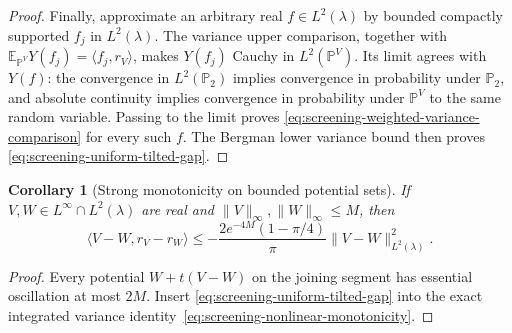 \documentclass[11pt,a4paper]{article}
\numberwithin{equation}{section}
\newtheorem{corollary}[theorem]{Corollary}
\theoremstyle{definition}
\theoremstyle{remark}
\begin{document}
\begin{proof}
Finally, approximate an arbitrary real $f\in L^2(\lambda)$ by
bounded compactly supported $f_j$ in $L^2(\lambda)$.  The variance
upper comparison, together with
$\mathbb E_{\mathbb P^V}Y(f_j)=\langle f_j,r_V\rangle$, makes
$Y(f_j)$ Cauchy in $L^2(\mathbb P^V)$.  Its limit agrees with
$Y(f)$: the convergence in $L^2(\mathbb P_2)$ implies convergence
in probability under $\mathbb P_2$, and absolute continuity implies
convergence in probability under $\mathbb P^V$ to the same random
variable.  Passing to the limit proves
\eqref{eq:screening-weighted-variance-comparison} for every such $f$.
The Bergman lower variance bound then proves
\eqref{eq:screening-uniform-tilted-gap}.
\end{proof}

\begin{corollary}[Strong monotonicity on bounded potential sets]
\label{cor:screening-uniform-monotonicity}
If $V,W\in L^\infty\cap L^2(\lambda)$ are real and
$\|V\|_\infty,\|W\|_\infty\le M$, then
\begin{equation}
 \langle V-W,r_V-r_W\rangle
 \le -\frac{2e^{-4M}(1-\pi/4)}{\pi}
                  \|V-W\|_{L^2(\lambda)}^2.
 \label{eq:screening-uniform-monotonicity}
\end{equation}
\end{corollary}

\begin{proof}
Every potential $W+t(V-W)$ on the joining segment has essential
oscillation at most $2M$.  Insert
\eqref{eq:screening-uniform-tilted-gap} into the exact integrated
variance identity~\eqref{eq:screening-nonlinear-monotonicity}.
\end{proof}
\end{document}
